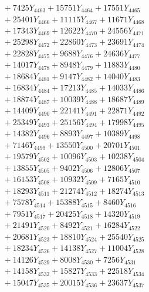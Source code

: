 \documentclass[a4paper,10pt]{article}
\begin{document}
{\begin{align}
&\;  + 7425 Y_{4463} + 15751 Y_{4464} + 17551 Y_{4465} \\[0.3ex]
&\;  + 25401 Y_{4466} + 11115 Y_{4467} + 11671 Y_{4468} \\[0.5ex]\allowbreak
&\;  + 17343 Y_{4469} + 12622 Y_{4470} + 24556 Y_{4471} \\[0.3ex]
&\;  + 25298 Y_{4472} + 22860 Y_{4473} + 23691 Y_{4474} \\[0.3ex]
&\;  + 22828 Y_{4475} + 9688 Y_{4476} + 24636 Y_{4477} \\[0.3ex]
&\;  + 14017 Y_{4478} + 8948 Y_{4479} + 11883 Y_{4480} \\[0.3ex]
&\;  + 18684 Y_{4481} + 9147 Y_{4482} + 14040 Y_{4483} \\[0.3ex]
&\;  + 16834 Y_{4484} + 17213 Y_{4485} + 14033 Y_{4486} \\[0.3ex]
&\;  + 18874 Y_{4487} + 10039 Y_{4488} + 18687 Y_{4489} \\[0.3ex]
&\;  + 14409 Y_{4490} + 22141 Y_{4491} + 22871 Y_{4492} \\[0.3ex]
&\;  + 25349 Y_{4493} + 25156 Y_{4494} + 17998 Y_{4495} \\[0.3ex]
&\;  + 14382 Y_{4496} + 8893 Y_{4497} + 10389 Y_{4498} \\[0.5ex]\allowbreak
&\;  + 7146 Y_{4499} + 13550 Y_{4500} + 20701 Y_{4501} \\[0.3ex]
&\;  + 19579 Y_{4502} + 10096 Y_{4503} + 10238 Y_{4504} \\[0.3ex]
&\;  + 13855 Y_{4505} + 9402 Y_{4506} + 12806 Y_{4507} \\[0.3ex]
&\;  + 16153 Y_{4508} + 10932 Y_{4509} + 7165 Y_{4510} \\[0.3ex]
&\;  + 18293 Y_{4511} + 21274 Y_{4512} + 18274 Y_{4513} \\[0.3ex]
&\;  + 7578 Y_{4514} + 15388 Y_{4515} + 8460 Y_{4516} \\[0.3ex]
&\;  + 7951 Y_{4517} + 20425 Y_{4518} + 14320 Y_{4519} \\[0.3ex]
&\;  + 21491 Y_{4520} + 8492 Y_{4521} + 16284 Y_{4522} \\[0.3ex]
&\;  + 20681 Y_{4523} + 18810 Y_{4524} + 25540 Y_{4525} \\[0.3ex]
&\;  + 18234 Y_{4526} + 14138 Y_{4527} + 11004 Y_{4528} \\[0.5ex]\allowbreak
&\;  + 14126 Y_{4529} + 8008 Y_{4530} + 7256 Y_{4531} \\[0.3ex]
&\;  + 14158 Y_{4532} + 15827 Y_{4533} + 22518 Y_{4534} \\[0.3ex]
&\;  + 15047 Y_{4535} + 20015 Y_{4536} + 23637 Y_{4537} \\[0.3ex]

\end{align}}
\end{document}
